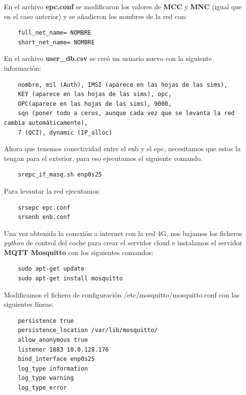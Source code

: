 \begin{enumerate}
{En el archivo \textbf{epc.conf} se modificaron los valores de \textbf{MCC} y \textbf{MNC} (igual que en el caso anterior) y se añadieron los nombres de la red con:
\begin{lstlisting}
    full_net_name= NOMBRE
    short_net_name= NOMBRE
\end{lstlisting}

En el archivo \textbf{user_db.csv} se creó un usuario nuevo con la siguiente información:
\begin{lstlisting}
    nombre, mil (Auth), IMSI (aparece en las hojas de las sims),
    KEY (aparece en las hojas de las sims), opc,
    OPC(aparece en las hojas de las sims), 9000,
    sqn (poner todo a ceros, aunque cada vez que se levanta la red cambia automáticamente),
    7 (QCI), dynamic (IP_alloc)
\end{lstlisting}

\item Ahora que tenemos conectividad entre el enb y el epc, necesitamos que estos la tengan para el exterior, para eso ejecutamos el siguiente comando.

\begin{lstlisting}
    srepc_if_masq.sh enp0s25
\end{lstlisting}

\item Para levantar la red ejecutamos:
\begin{lstlisting}
    srsepc epc.conf
    srsenb enb.conf
\end{lstlisting}

\item Una vez obtenida la conexión a internet con la red 4G, nos bajamos los ficheros \textit{python} de control del coche para crear el servidor cloud e instalamos el servidor \textbf{MQTT Mosquitto} con los siguientes comandos:

\begin{lstlisting}
	sudo apt-get update
	sudo apt-get install mosquitto
\end{lstlisting}

\item Modificamos el fichero de configuración /etc/mosquitto/mosquitto.conf con las siguientes líneas:
\begin{lstlisting}
	persistence true
	persistence_location /var/lib/mosquitto/
	allow_anonymous true
	listener 1883 10.0.128.176
	bind_interface enp0s25
	log_type information
	log_type warning
	log_type error
\end{lstlisting}

}
\end{enumerate}
